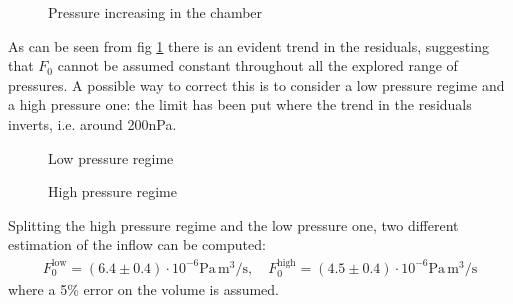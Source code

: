 \documentclass[11pt,a4 paper]{article}
\begin{document}
\begin{figure}[H]
  \centering
   \hspace{-0.05\textwidth}
  \caption{Pressure increasing in the chamber}
  \label{fig:increase_all}
\end{figure}

As can be seen from fig \ref{fig:increase_all} there is an evident trend in the residuals, suggesting that $F_0$ cannot be assumed constant throughout all the explored range of pressures. A possible way to correct this is to consider a low pressure regime and a high pressure one: the limit has been put where the trend in the residuals inverts, i.e. around 200\si{\nano\pascal}.
\begin{figure}[H]
  \centering
   \hspace{-0.05\textwidth}
  \caption{Low pressure regime}
  \label{fig:increase_lowP}
\end{figure}
\begin{figure}[H]
  \centering
   \hspace{-0.05\textwidth}
  \caption{High pressure regime}
  \label{fig:increase_highP}
\end{figure}


Splitting the high pressure regime and the low pressure one, two different estimation of the inflow can be computed:
\begin{gather*}
  F_0^\text{low} = (6.4 \pm 0.4) \cdot 10^{-6} \si{\pascal}\, \si{\metre^3}/\si{\second}, \quad
  F_0^\text{high} = (4.5 \pm 0.4) \cdot 10^{-6} \si{\pascal}\, \si{\metre^3}/\si{\second}
\end{gather*}
where a 5\% error on the volume is assumed.
\end{document}
